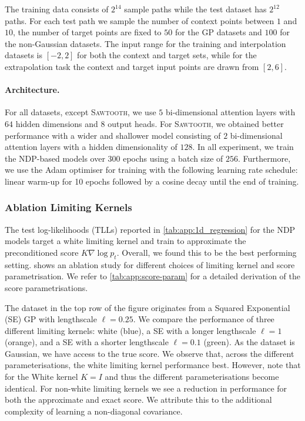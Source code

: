 The training data consists of $2^{14}$ sample paths while the test dataset has $2^12$ paths.
For each test path we sample the number of context points between $1$ and $10$, the number of target points are fixed to $50$ for the GP datasets and $100$ for the non-Gaussian datasets.
The input range for the training and interpolation datasets is $[-2, 2]$ for both the context and target sets, while for the extrapolation task the context and target input points are drawn from $[2, 6]$.

\paragraph{Architecture.}
For all datasets, except {\scshape Sawtooth}, we use $5$ bi-dimensional attention layers \parencite{dutordoir2022Neural} with $64$ hidden dimensions and $8$ output heads.
For {\scshape Sawtooth}, we obtained better performance with a wider and shallower model consisting of $2$ bi-dimensional attention layers with a hidden dimensionality of $128$.
In all experiment, we train the NDP-based models over $300$ epochs using a batch size of $256$.
Furthermore, we use the Adam optimiser for training with the following learning rate schedule: linear warm-up for 10 epochs followed by a cosine decay until the end of training.

\subsubsection{Ablation Limiting Kernels}

The test log-likelihoods (TLLs) reported in \cref{tab:app:1d_regression} for the NDP models target a white limiting kernel and train to approximate the preconditioned score $K \nabla \log p_t$.
Overall, we found this to be the best performing setting.
 shows an ablation study for different choices of limiting kernel and score parametrisation.
We refer to \cref{tab:app:score-param} for a detailed derivation of the score parametrisations.

The dataset in the top row of the figure originates from a Squared Exponential (SE) GP with lengthscale $\ell = 0.25$.
We compare the performance of three different limiting kernels: white (blue), a SE with a longer lengthscale $\ell=1$ (orange), and a SE with a shorter lengthscale $\ell=0.1$ (green).
As the dataset is Gaussian, we have access to the true score.
We observe that, across the different parameterisations, the white limiting kernel performance best.
However, note that for the White kernel $K = I$ and thus the different parameterisations become identical.
For non-white limiting kernels we see a reduction in performance for both the approximate and exact score.
We attribute this to the additional complexity of learning a non-diagonal covariance.


